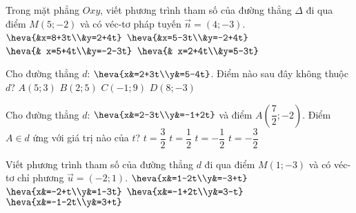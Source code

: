 \begin{ex}%
	Trong mặt phẳng $Oxy$, viết phương trình tham số của đường thẳng $\Delta$ đi qua điểm $M(5;-2)$ và có véc-tơ pháp tuyến $\overrightarrow{n} =(4;-3)$.
	\choice
	{\True $\heva{&x=8+3t\\&y=2+4t}$}
	{$\heva{&x=5-3t\\&y=-2+4t}$}
	{$\heva{& x=5+4t\\&y=-2-3t}$}
	{$\heva{& x=2+4t\\&y=5-3t}$}
\end{ex}


\begin{ex}%
	Cho đường thẳng $d$: $\heva{x&=2+3t\\y&=5-4t}$. Điểm nào sau đây không thuộc $d$?
	\choice
	{\True $A(5;3)$}
	{$B(2;5)$}
	{$C(-1;9)$}
	{$D(8;-3)$}
\end{ex}


\begin{ex}%
	Cho đường thẳng $d$: $\heva{x&=2-3t\\y&=-1+2t}$ và điểm $A\left(\dfrac{7}{2};-2\right)$. Điểm $A\in d$ ứng với giá trị nào của $t$?
	\choice
	{$t=\dfrac{3}{2}$}
	{$t=\dfrac{1}{2}$}
	{\True $t=-\dfrac{1}{2}$}
	{$t=-\dfrac{3}{2}$}
\end{ex}

\begin{ex}%
	Viết phương trình tham số của đường thẳng $d$ đi qua điểm $M(1;-3)$ và có véc-tơ chỉ phương $\overrightarrow{u}=(-2;1)$.
	\choice
	{\True $\heva{x&=1-2t\\y&=-3+t}$}
	{$\heva{x&=-2+t\\y&=1-3t}$}
	{$\heva{x&=-1+2t\\y&=3-t}$}
	{$\heva{x&=-1-2t\\y&=3+t}$}
\end{ex}


